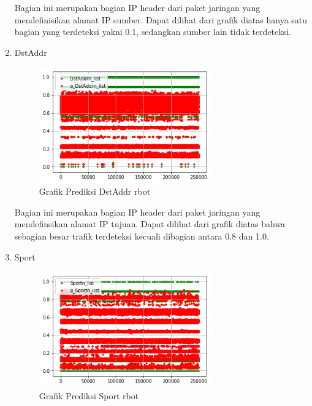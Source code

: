 \documentclass[./skripsi.tex]{subfiles}
\begin{document}
\begin{enumerate}
    \par Bagian ini merupakan bagian IP header dari paket jaringan yang mendefinisikan alamat IP sumber. Dapat dilihat dari grafik diatas hanya satu bagian yang terdeteksi yakni 0.1, sedangkan sumber lain tidak terdeteksi.
    
    \item DstAddr
    \begin{figure}%
        \centering
        \includegraphics[width=0.7\textwidth]{public/assets/img/lstmm_rbot_pred3.png}
        \caption{Grafik Prediksi DstAddr rbot}
        \label{fig:lstmm_rbot_pred3}
    \end{figure}
    
    \par Bagian ini merupakan bagian IP header dari paket jaringan yang mendefinsikan alamat IP tujuan. Dapat dilihat dari grafik diatas bahwa sebagian besar trafik terdeteksi kecuali dibagian antara 0.8 dan 1.0.
    
    \item Sport
    \begin{figure}%
        \centering
        \includegraphics[width=0.7\textwidth]{public/assets/img/lstmm_rbot_pred4.png}
        \caption{Grafik Prediksi Sport rbot}
        \label{fig:lstmm_rbot_pred4}
    \end{figure}
    

\end{enumerate}
\end{document}
